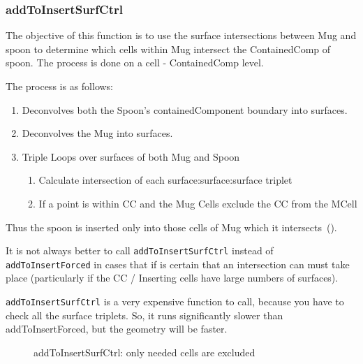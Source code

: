 \subsubsection{addToInsertSurfCtrl}

The objective of this function is to use the surface intersections between Mug and spoon to determine which 
cells within Mug intersect the ContainedComp of spoon. The process is done on a cell - ContainedComp level. 

The process is as follows:
\begin{enumerate}

\item{Deconvolves both the Spoon's containedComponent boundary into surfaces.}
\item Deconvolves the Mug into surfaces.
\item{Triple Loops over surfaces of both Mug and Spoon}
  \begin{enumerate}
  \item{Calculate intersection of each surface:surface:surface triplet}
  \item{If a point is within CC and the Mug Cells exclude the CC from the
    MCell}
  \end{enumerate}
\end{enumerate}
   
Thus the spoon is inserted only into those cells of Mug which it intersects~().

It is not always better to call {\tt addToInsertSurfCtrl} instead of
{\tt addToInsertForced} in cases that if is certain that an
intersection can must take place (particularly if the CC / Inserting
cells have large numbers of surfaces).

{\tt addToInsertSurfCtrl} is a very expensive function to call,
because you have to check all the surface triplets. So, it runs significantly
slower than addToInsertForced, but the geometry will be faster.

\begin{figure}
  \centering
   \quad
  \caption{addToInsertSurfCtrl: only needed cells are excluded}
  \label{fig:surfctrl}
\end{figure}

